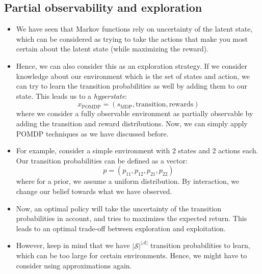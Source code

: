 \subsection{Partial observability and exploration}
\begin{itemize}
	\item We have seen that Markov functions rely on uncertainty of the latent state, which can be considered as trying to take the actions that make you most certain about the latent state (while maximizing the reward).
	\item Hence, we can also consider this as an exploration strategy. If we consider knowledge about our environment which is the set of states and action, we can try to learn the transition probabilities as well by adding them to our state. This leads us to a \textit{hyperstate}:
	$$x_{\text{POMDP}} = (s_{\text{MDP}}, \text{transition}, \text{rewards})$$
	where we consider a fully observable environment as partially observable by adding the transition and reward distributions. Now, we can simply apply POMDP techniques as we have discussed before.
	\item For example, consider a simple environment with 2 states and 2 actions each. Our transition probabilities can be defined as a vector:
	$$p=(p_{11},p_{12},p_{21},p_{22})$$
	where for a prior, we assume a uniform distribution. By interaction, we change our belief towards what we have observed.
	\item Now, an optimal policy will take the uncertainty of the transition probabilities in account, and tries to maximizes the expected return. This leads to an optimal trade-off between exploration and exploitation.
	\item However, keep in mind that we have $|\mathcal{S}|^{|\mathcal{A}|}$ transition probabilities to learn, which can be too large for certain environments. Hence, we might have to consider using approximations again.
\end{itemize}

